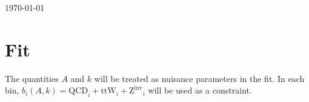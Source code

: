 \documentclass[12pt]{article}
\begin{document}
\today



\section{Fit}
The quantities $A$ and $k$ will be treated as nuisance parameters in the fit.  In each bin,
$b_i(A,k) = \mathrm{QCD}_i + \mathrm{ttW}_i + \mathrm{Z^{inv}}_i$ will be used as a constraint.
\end{document}
